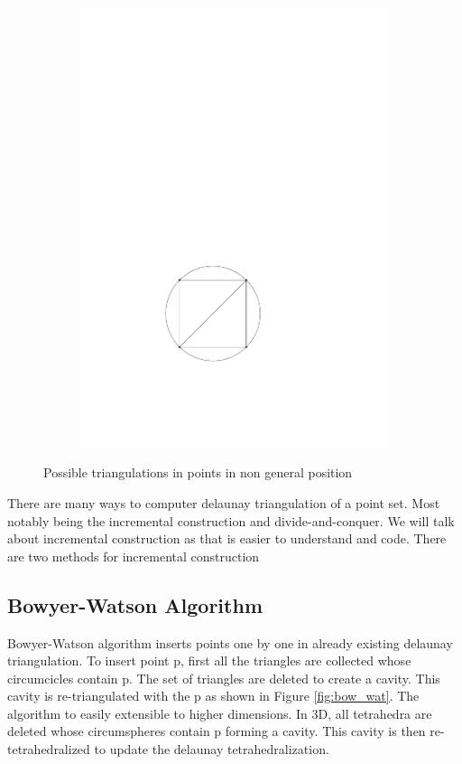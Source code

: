 \begin{figure}[h]
\begin{subfigure}[t]{0.5\textwidth}
        \includegraphics{images/non_general_pos_b.pdf}
    \end{subfigure}
    \caption{Possible triangulations in points in non general position}
    \label{fig:non_general_pos}
\end{figure}

There are many ways to computer delaunay triangulation of a point set. Most notably being the incremental construction and divide-and-conquer. We will talk about incremental construction as that is easier to understand and code. There are two methods for incremental construction

\subsection{Bowyer-Watson Algorithm}
Bowyer-Watson algorithm inserts points one by one in already existing delaunay triangulation. To insert point p, first all the triangles are collected whose circumcicles contain p. The set of triangles are deleted to create a cavity. This cavity is re-triangulated with the p as shown in Figure \ref{fig:bow_wat}. The algorithm to easily extensible to higher dimensions. In 3D, all tetrahedra are deleted whose circumspheres contain p forming a cavity. This cavity is then re-tetrahedralized to update the delaunay tetrahedralization. 

